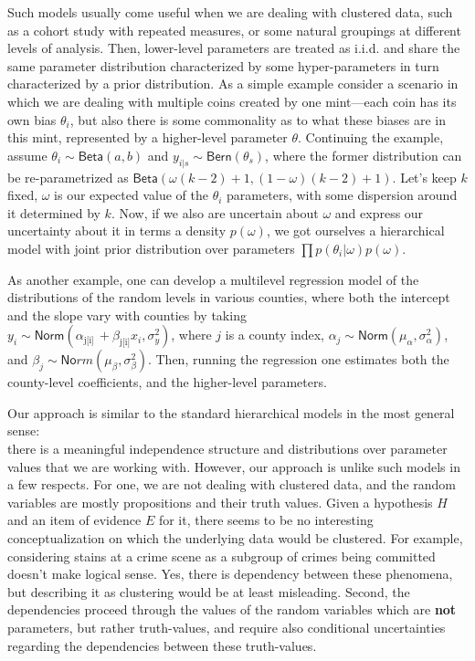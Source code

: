 \documentclass[
  10pt,
  dvipsnames,enabledeprecatedfontcommands]{scrartcl}
\begin{document}
Such models usually come useful when we are dealing with clustered data,
such as a cohort study with repeated measures, or some natural groupings
at different levels of analysis. Then, lower-level parameters are
treated as i.i.d. and share the same parameter distribution
characterized by some hyper-parameters in turn characterized by a prior
distribution. As a simple example consider a scenario in which we are
dealing with multiple coins created by one mint---each coin has its own
bias \(\theta_i\), but also there is some commonality as to what these
biases are in this mint, represented by a higher-level parameter
\(\theta\). Continuing the example, assume
\(\theta_i \sim \mathsf{Beta}(a, b)\) and
\(y_{i\vert s} \sim \mathsf{Bern}(\theta_s)\), where the former
distribution can be re-parametrized as
\(\mathsf{Beta}(\omega(k-2)+1, (1-\omega)(k-2)+1)\). Let's keep \(k\)
fixed, \(\omega\) is our expected value of the \(\theta_i\) parameters,
with some dispersion around it determined by \(k\). Now, if we also are
uncertain about \(\omega\) and express our uncertainty about it in terms
a density \(p(\omega)\), we got ourselves a hierarchical model with
joint prior distribution over parameters
\(\prod p(\theta_i \vert \omega) p(\omega)\).

As another example, one can develop a multilevel regression model of the
distributions of the random levels in various counties, where both the
intercept and the slope vary with counties by taking\\
\(y_i\sim \mathsf{Norm}(\alpha_{\mbox{j[i]}}\, + \beta_{\mbox{j[i]}} x_i, \sigma^2_y )\),
where \(j\) is a county index,
\(\alpha_j \sim \mathsf{Norm}(\mu_\alpha,\sigma_\alpha^2 )\), and
\(\beta_j \sim \mathsf{No}rm(\mu_\beta,\sigma_\beta^2 )\). Then, running
the regression one estimates both the county-level coefficients, and the
higher-level parameters.

Our approach is similar to the standard hierarchical models in the most
general sense:\\
there is a meaningful independence structure and distributions over
parameter values that we are working with. However, our approach is
unlike such models in a few respects. For one, we are not dealing with
clustered data, and the random variables are mostly propositions and
their truth values. Given a hypothesis \(H\) and an item of evidence
\(E\) for it, there seems to be no interesting conceptualization on
which the underlying data would be clustered. For example, considering
stains at a crime scene as a subgroup of crimes being committed doesn't
make logical sense. Yes, there is dependency between these phenomena,
but describing it as clustering would be at least misleading. Second,
the dependencies proceed through the values of the random variables
which are \textbf{not} parameters, but rather truth-values, and require
also conditional uncertainties regarding the dependencies between these
truth-values.
\end{document}
